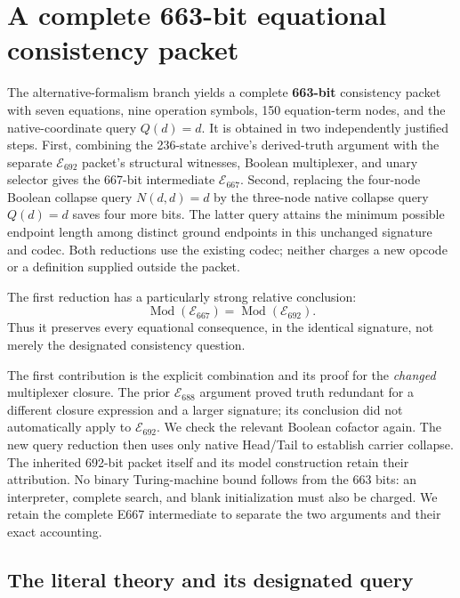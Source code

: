 \section{A complete 663-bit equational consistency packet}
\label{sec:e667}

The alternative-formalism branch yields a complete \textbf{663-bit}
consistency packet with seven equations, nine operation symbols,
150 equation-term nodes, and the native-coordinate query $Q(d)=d$.
It is obtained in two independently justified steps.  First, combining
the 236-state archive's derived-truth argument with the separate
$\mathcal E_{692}$ packet's structural witnesses, Boolean multiplexer,
and unary selector gives the 667-bit intermediate $\mathcal E_{667}$.
Second, replacing the four-node Boolean collapse query $N(d,d)=d$
by the three-node native collapse query $Q(d)=d$ saves four more bits.
The latter query attains the minimum possible endpoint length among
distinct ground endpoints in this unchanged signature and codec.
Both reductions use the existing codec; neither charges a new opcode
or a definition supplied outside the packet.

The first reduction has a particularly strong relative conclusion:
\begin{equation}
 \operatorname{Mod}(\mathcal E_{667})
   =\operatorname{Mod}(\mathcal E_{692}).
 \label{eq:e667-models}
\end{equation}
Thus it preserves every equational consequence, in the identical
signature, not merely the designated consistency question.

The first contribution is the explicit combination and its proof for the
\emph{changed} multiplexer closure.  The prior $\mathcal E_{688}$ argument
proved truth redundant for a different closure expression and a larger
signature; its conclusion did not automatically apply to
$\mathcal E_{692}$.  We check the relevant Boolean cofactor again.
The new query reduction then uses only native Head/Tail to establish
carrier collapse.  The inherited 692-bit packet itself and its model
construction retain their attribution.  No binary Turing-machine bound
follows from the 663 bits: an interpreter, complete search, and blank
initialization must also be charged.  We retain the complete E667
intermediate to separate the two arguments and their exact accounting.

\subsection{The literal theory and its designated query}

